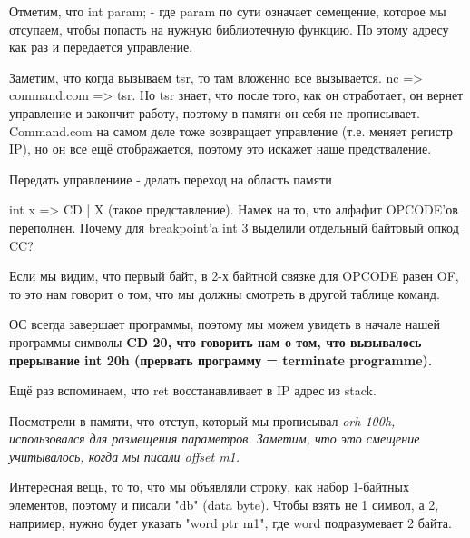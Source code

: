 Отметим, что int param; - где param по сути означает семещение, которое мы отсупаем, чтобы попасть на нужную библиотечную функцию. По этому адресу как раз и передается управление.

Заметим, что когда вызываем tsr, то там вложенно все вызывается. nc => command.com => tsr. Но tsr знает, что после того, как он отработает, он вернет управление и закончит работу, поэтому в памяти он себя не прописывает. Command.com на самом деле тоже возвращает управление (т.е. меняет регистр IP), но он все ещё отображается, поэтому это искажет наше предстваление. 

\begin{rem} Передать управлениие - делать переход на область памяти\end{rem}
\begin{hw} int x => CD | X (такое представление). Намек на то, что алфафит OPCODE'ов переполнен. Почему для breakpoint'a int 3 выделили отдельный байтовый опкод CC?\end{hw}

\begin{rem} Если мы видим, что первый байт, в 2-х байтной связке для OPCODE равен OF, то это нам говорит о том, что мы должны смотреть в другой таблице команд.\end{rem}

ОС всегда завершает программы, поэтому мы можем увидеть в начале нашей программы символы
\bfseries CD 20\mdseries , что говорить нам о том, что вызывалось прерывание int 20h (прервать программу = terminate programme).

Ещё раз вспоминаем, что ret восстанавливает в IP адрес из stack.

Посмотрели в памяти, что отступ, который мы прописывал \slshape orh 100h\upshape , использовался для размещения параметров. Заметим, что это смещение учитывалось, когда мы писали offset m1. 

Интересная вещь, то то, что  мы объявляли строку, как набор 1-байтных элементов, поэтому и писали "db" (data byte). Чтобы взять не 1 символ, а 2, например, нужно будет указать "word ptr m1", где word подразумевает 2 байта.    
